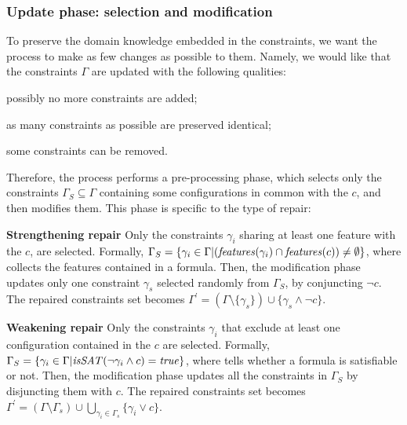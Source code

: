 \begin{tikzborder}{\cite{Gargantini16:validation}}
\begin{tikzborder}{\cite{gargantini_combinatorial_2017}}
\begin{tikzborder}{\cite{garn2019}}
\begin{tikzborder}{\cite{arcaini2019achieving}}
\begin{tikzborder}{\cite{arcaini2019varivolution}}
		\subsubsection{Update phase: \textsf{selection} and \textsf{modification}}\label{sec:selectionAndMod}
		\bb To preserve the domain knowledge embedded in the constraints, we want the process to make as few changes as possible to them. Namely, we would like that the constraints $\Gamma$ are updated with the following qualities:
		\begin{compactenum}
			\item possibly no more constraints are added;
			\item as many constraints as possible are preserved identical;
			\item some constraints can be removed.
		\end{compactenum} 
		Therefore, the process performs a pre-processing phase, which selects only the constraints $\Gamma_S \subseteq \Gamma$ containing some configurations in common with the \fcc $c$, and then modifies them. This phase is specific to the type of repair:
		\begin{compactitem}
			\item[\textbf{Strengthening repair}] Only the constraints $\gamma_i$ sharing at least one feature with the \fcc $c$, are selected. Formally, $\Gamma_S = \{\gamma_i \in \Gamma | (\mathit{features}(\gamma_i) \cap \mathit{features}(c)) \neq \emptyset\}$, where \features collects the features contained in a formula. Then, the modification phase updates only one constraint $\gamma_s$ selected randomly from $\Gamma_S$, by conjuncting $\neg c$. The repaired constraints set becomes $\Gamma^\prime = (\Gamma \setminus \{\gamma_s\}) \cup \{\gamma_s \wedge \neg c\}$.
			\item[\textbf{Weakening repair}] Only the constraints $\gamma_i$ that exclude at least one configuration contained in the \fcc $c$ are selected. Formally, $\Gamma_S = \{\gamma_i \in \Gamma | \mathit{isSAT}(\neg \gamma_i \wedge c )=\mathit{true}\}$, where \sat tells whether a formula is satisfiable or not. Then, the modification phase updates all the constraints in $\Gamma_S$ by disjuncting them with $c$. The repaired constraints set becomes $\Gamma^\prime = (\Gamma \setminus \Gamma_s) \cup \bigcup_{\gamma_i \in \Gamma_s} \{\gamma_i \vee c\}$.
		\end{compactitem}\be
		

\end{tikzborder}
\end{tikzborder}
\end{tikzborder}
\end{tikzborder}
\end{tikzborder}
